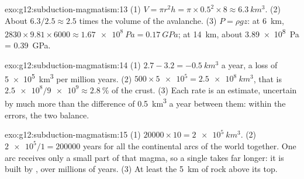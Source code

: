 \begin{solution}{exo:g12:subduction-magmatism:13}
(1) $V = \pi r^2 h = \pi \times 0.5^2 \times 8 \approx \qty{6.3}{km^3}$.
(2) About $6.3/2.5 \approx 2.5$ times the volume of the avalanche.
(3) $P = \rho g z$: at \qty{6}{km}, $2830 \times 9.81 \times 6000 \approx
\qty{1.67e8}{Pa} = \qty{0.17}{GPa}$; at \qty{14}{km}, about
\qty{3.89e8}{Pa} = \qty{0.39}{GPa}.
\end{solution}

\begin{solution}{exo:g12:subduction-magmatism:14}
(1) $2.7 - 3.2 = \qty{-0.5}{km^3}$ a year, a loss of \qty{5e5}{km^3} per
million years. (2) $500 \times \num{5e5} = \qty{2.5e8}{km^3}$, that is
$\num{2.5e8}/\num{9e9} \approx \qty{2.8}{\percent}$ of the crust. (3) Each
rate is an estimate, uncertain by much more than the difference of
\qty{0.5}{km^3} a year between them: within the errors, the two balance.
\end{solution}

\begin{solution}{exo:g12:subduction-magmatism:15}
(1) $\num{20000} \times 10 = \qty{2e5}{km^3}$. (2) $\num{2e5}/1 =
\num{200000}$ years for all the continental arcs of the world together. One
arc receives only a small part of that magma, so a single  takes
far longer: it is built  by , over millions of years. (3) At
least the \qty{5}{km} of rock above its top.
\end{solution}

